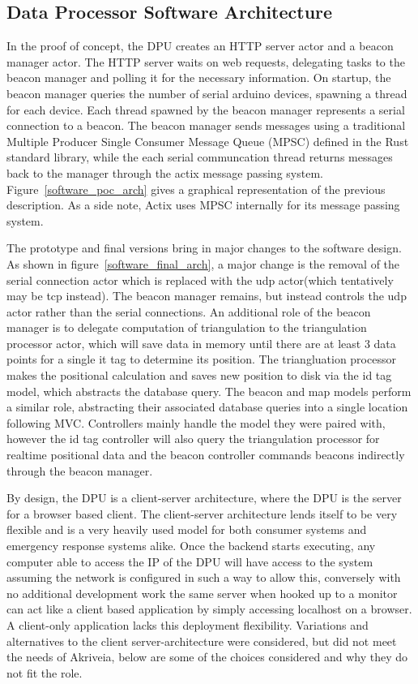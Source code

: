 \subsection{Data Processor Software Architecture}
In the proof of concept, the DPU creates an HTTP server actor and a beacon manager actor.
The HTTP server waits on web requests, delegating tasks to the beacon manager and polling it for the necessary information.
On startup, the beacon manager queries the number of serial arduino devices, spawning a thread for each device.
Each thread spawned by the beacon manager represents a serial connection to a beacon.
The beacon manager sends messages using a traditional Multiple Producer Single Consumer Message Queue (MPSC) defined in the Rust standard library, while the each serial communcation thread returns messages back to the manager through the actix message passing system.
Figure~\ref{software_poc_arch} gives a graphical representation of the previous description.
As a side note, Actix uses MPSC internally for its message passing system.

\bigskip
The prototype and final versions bring in major changes to the software design.
As shown in figure~\ref{software_final_arch}, a major change is the removal of the serial connection actor which is replaced with the udp actor(which tentatively may be tcp instead).
The beacon manager remains, but instead controls the udp actor rather than the serial connections.
An additional role of the beacon manager is to delegate computation of triangulation to the triangulation processor actor, which will save data in memory until there are at least 3 data points for a single it tag to determine its position.
The triangluation processor makes the positional calculation and saves new position to disk via the id tag model, which abstracts the database query.
The beacon and map models perform a similar role, abstracting their associated database queries into a single location following MVC.
Controllers mainly handle the model they were paired with, however the id tag controller will also query the triangulation processor for realtime positional data and the beacon controller commands beacons indirectly through the beacon manager.

\bigskip
By design, the DPU is a client-server architecture, where the DPU is the server for a browser based client.
The client-server architecture lends itself to be very flexible and is a very heavily used model for both consumer systems and emergency response systems alike.
Once the backend starts executing, any computer able to access the IP of the DPU will have access to the system assuming the network is configured in such a way to allow this, conversely with no additional development work the same server when hooked up to a monitor can act like a client based application by simply accessing localhost on a browser.
A client-only application lacks this deployment flexibility.
Variations and alternatives to the client server-architecture were considered, but did not meet the needs of Akriveia, below are some of the choices considered and why they do not fit the role.

